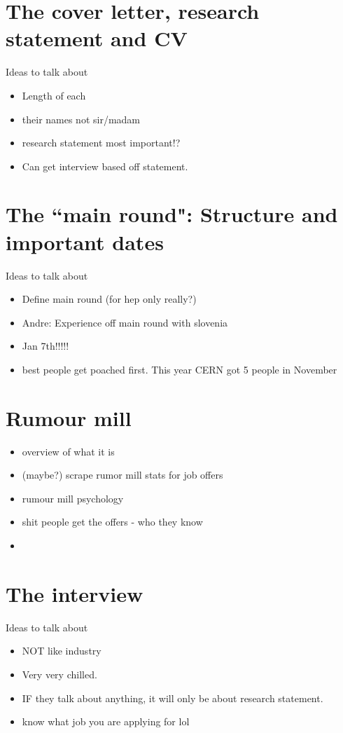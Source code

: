 \documentclass[10pt]{beamer}
\begin{document}
\section{The cover letter, research statement and CV}
\begin{frame}
Ideas to talk about
\begin{itemize}
	\item Length of each
	\item their names not sir/madam
	\item research statement most important!?
	\item Can get interview based off statement. 
\end{itemize}

\end{frame}
\section{The ``main round": Structure and important dates}
\begin{frame}
Ideas to talk about
	\begin{itemize}
		\item Define main round (for hep only really?)
		\item Andre: Experience off main round with slovenia 
		\item Jan 7th!!!!!
		\item best people get poached first. This year CERN got 5 people in November
	\end{itemize}

\end{frame}


\section{Rumour mill}
\begin{frame}
\begin{itemize}
	\item overview of what it is
		\item (maybe?) scrape rumor mill stats for job offers
		\item rumour mill psychology
		\item shit people get the offers  - who they know 
		\item 
\end{itemize}
\end{frame}


\section{The interview}
\begin{frame}
Ideas to talk about
\begin{itemize}
	\item NOT like industry
	\item Very very chilled.
	\item IF they talk about anything, it will only be about research statement. 
	\item know what job you are applying for lol
\end{itemize}

\end{frame}
\end{document}
